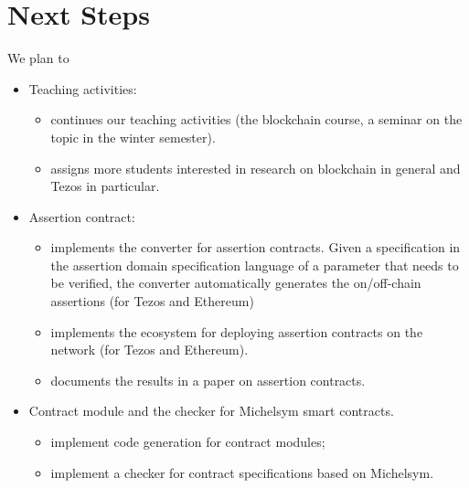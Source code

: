 \documentclass[a4paper,11pt]{article}
\begin{document}
\section{Next Steps}
 
We plan to 
\begin{itemize}
\item Teaching activities:
\begin{itemize}
\item continues our teaching activities (the blockchain course, a seminar on the topic in the winter semester).
\item assigns more students interested in research on blockchain in general and Tezos in particular.
\end{itemize}
\item Assertion contract:
\begin{itemize}
\item implements the converter for assertion contracts. Given a specification in the assertion domain specification language of a parameter that needs to be verified, the converter automatically generates the on/off-chain assertions (for Tezos and Ethereum)
\item implements the ecosystem for deploying assertion contracts on the network (for Tezos and Ethereum). 
\item documents the results in a paper on assertion contracts.
\end{itemize}

\item Contract module and the checker for Michelsym smart contracts.
\begin{itemize}
\item implement code generation for contract modules; 
\item implement a checker for contract specifications based on Michelsym.
\end{itemize}

\end{itemize}





\end{document}
